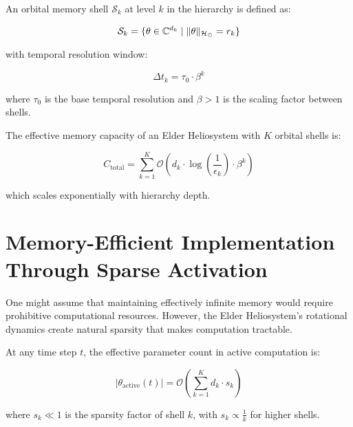 \begin{definition}
An orbital memory shell $\mathcal{S}_k$ at level $k$ in the hierarchy is defined as:

\begin{equation}
\mathcal{S}_k = \{\theta \in \mathbb{C}^{d_k} \mid \|\theta\|_{\mathcal{H}_{\odot}} = r_k\}
\end{equation}

with temporal resolution window:

\begin{equation}
\Delta t_k = \tau_0 \cdot \beta^k
\end{equation}

where $\tau_0$ is the base temporal resolution and $\beta > 1$ is the scaling factor between shells.
\end{definition}

\begin{theorem}
The effective memory capacity of an Elder Heliosystem with $K$ orbital shells is:

\begin{equation}
C_{\text{total}} = \sum_{k=1}^K \mathcal{O}(d_k \cdot \log(\frac{1}{\epsilon_k}) \cdot \beta^k)
\end{equation}

which scales exponentially with hierarchy depth.
\end{theorem}


\section{Memory-Efficient Implementation Through Sparse Activation}

One might assume that maintaining effectively infinite memory would require prohibitive computational resources. However, the Elder Heliosystem's rotational dynamics create natural sparsity that makes computation tractable.

\begin{theorem}
At any time step $t$, the effective parameter count in active computation is:

\begin{equation}
|\theta_{\text{active}}(t)| = \mathcal{O}(\sum_{k=1}^K d_k \cdot s_k)
\end{equation}

where $s_k \ll 1$ is the sparsity factor of shell $k$, with $s_k \propto \frac{1}{k}$ for higher shells.
\end{theorem}


